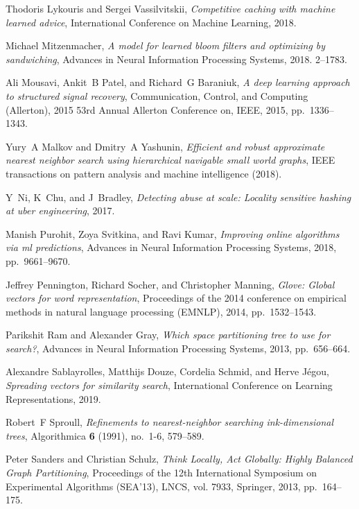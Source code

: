 \documentclass[11pt]{article}
\begin{document}
\begin{thebibliography}{10}
\begin{small}
Thodoris Lykouris and Sergei Vassilvitskii, \emph{Competitive caching with machine learned advice}, International Conference on Machine Learning, 2018.

Michael Mitzenmacher, \emph{A model for learned bloom filters and optimizing by sandwiching}, Advances in Neural Information Processing Systems, 2018.
2--1783.

Ali Mousavi, Ankit~B Patel, and Richard~G Baraniuk, \emph{A deep learning approach to structured signal recovery}, Communication, Control, and Computing (Allerton), 2015 53rd Annual Allerton Conference on, IEEE, 2015, pp.~1336--1343.

Yury~A Malkov and Dmitry~A Yashunin, \emph{Efficient and robust approximate nearest neighbor search using hierarchical navigable small world graphs}, IEEE transactions on pattern analysis and machine intelligence (2018).

Y~Ni, K~Chu, and J~Bradley, \emph{Detecting abuse at scale: Locality sensitive hashing at uber engineering}, 2017.

Manish Purohit, Zoya Svitkina, and Ravi Kumar, \emph{Improving online algorithms via ml predictions}, Advances in Neural Information Processing Systems, 2018, pp.~9661--9670.

Jeffrey Pennington, Richard Socher, and Christopher Manning, \emph{Glove: Global vectors for word representation}, Proceedings of the 2014 conference on empirical methods in natural language processing (EMNLP), 2014, pp.~1532--1543.

Parikshit Ram and Alexander Gray, \emph{Which space partitioning tree to use for search?}, Advances in Neural Information Processing Systems, 2013, pp.~656--664.

Alexandre Sablayrolles, Matthijs Douze, Cordelia Schmid, and Herve J\'egou, \emph{Spreading vectors for similarity search}, International Conference on Learning Representations, 2019.

Robert~F Sproull, \emph{Refinements to nearest-neighbor searching ink-dimensional trees}, Algorithmica \textbf{6} (1991), no.~1-6, 579--589.

Peter Sanders and Christian Schulz, \emph{{Think Locally, Act Globally: Highly Balanced Graph Partitioning}}, Proceedings of the 12th International Symposium on Experimental Algorithms (SEA'13), LNCS, vol. 7933, Springer, 2013, pp.~164--175.


\end{small}
\end{thebibliography}
\end{document}
